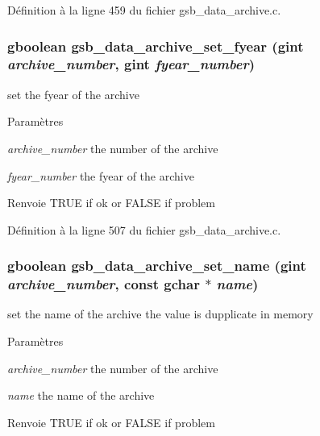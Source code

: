 Définition à la ligne 459 du fichier gsb\_\-data\_\-archive.c.

\subsubsection[{gsb\_\-data\_\-archive\_\-set\_\-fyear}]{\setlength{\rightskip}{0pt plus 5cm}gboolean gsb\_\-data\_\-archive\_\-set\_\-fyear (gint {\em archive\_\-number}, \/  gint {\em fyear\_\-number})}\label{gsb__data__archive_8c_ae4edb9d1b45b34750d48ba8405db21bf}
set the fyear of the archive


\begin{DoxyParams}{Paramètres}
\item[{\em archive\_\-number}]the number of the archive \item[{\em fyear\_\-number}]the fyear of the archive\end{DoxyParams}
\begin{DoxyReturn}{Renvoie}
TRUE if ok or FALSE if problem 
\end{DoxyReturn}


Définition à la ligne 507 du fichier gsb\_\-data\_\-archive.c.

\subsubsection[{gsb\_\-data\_\-archive\_\-set\_\-name}]{\setlength{\rightskip}{0pt plus 5cm}gboolean gsb\_\-data\_\-archive\_\-set\_\-name (gint {\em archive\_\-number}, \/  const gchar $\ast$ {\em name})}\label{gsb__data__archive_8c_abfc44c529725db841973582c3cf438ed}
set the name of the archive the value is dupplicate in memory


\begin{DoxyParams}{Paramètres}
\item[{\em archive\_\-number}]the number of the archive \item[{\em name}]the name of the archive\end{DoxyParams}
\begin{DoxyReturn}{Renvoie}
TRUE if ok or FALSE if problem 
\end{DoxyReturn}


